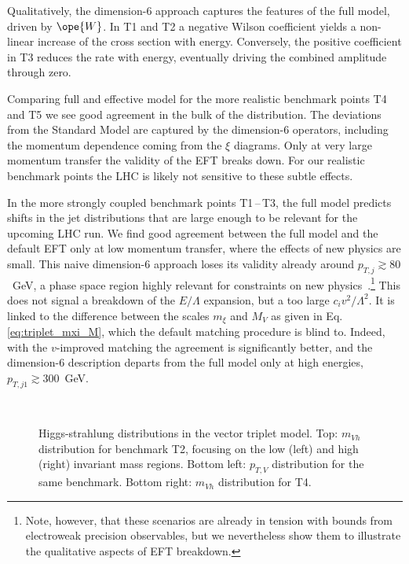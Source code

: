 Qualitatively, the dimension-6 approach captures the features of the
full model, driven by $\ope{W}$.  In T1 and T2 a negative Wilson
coefficient yields a non-linear increase of the cross section with
energy. Conversely, the positive coefficient in T3 reduces the rate
with energy, eventually driving the combined amplitude through zero.

Comparing full and effective model for the more realistic benchmark
points T4 and T5 we see good agreement in the bulk of the
distribution.  The deviations from the Standard Model are captured by
the dimension-6 operators, including the momentum dependence coming
from the $\xi$ diagrams. Only at very large momentum transfer the
validity of the EFT breaks down. For our realistic benchmark points
the LHC is likely not sensitive to these subtle effects.

In the more strongly coupled benchmark points T1\,--\,T3, the full
model predicts shifts in the jet distributions that are large enough
to be relevant for the upcoming LHC run. We find good agreement
between the full model and the default EFT only at low momentum
transfer, where the effects of new physics are small.  This naive
dimension-6 approach loses its validity already around $p_{T,j}
\gtrsim 80$~GeV, a phase space region highly relevant for constraints
on new physics~\cite{Corbett:2015ksa}.\footnote{Note, however, that these
scenarios are already in tension with bounds from electroweak
precision observables, but we nevertheless show them to illustrate the
qualitative aspects of EFT breakdown.} This does not signal a
breakdown of the $E / \Lambda$ expansion, but a too large $c_i v^2 /
\Lambda^2$. It is linked to the difference between the scales $m_\xi$
and $M_V$ as given in Eq.\,\eqref{eq:triplet_mxi_M}, which the default
matching procedure is blind to.  Indeed, with the $v$-improved
matching the agreement is significantly better, and the dimension-6
description departs from the full model only at high energies,
$p_{T,j1} \gtrsim 300$~GeV.\medskip

\begin{figure} \centering
   \\
  \caption{Higgs-strahlung distributions in the vector triplet model.
Top: $m_{Vh}$ distribution for benchmark T2, focusing on the low
(left) and high (right) invariant mass regions.  Bottom left:
$p_{T,V}$ distribution for the same benchmark.  Bottom right: $m_{Vh}$
distribution for T4.}
  \label{fig:validity_triplet_vh}
\end{figure}

